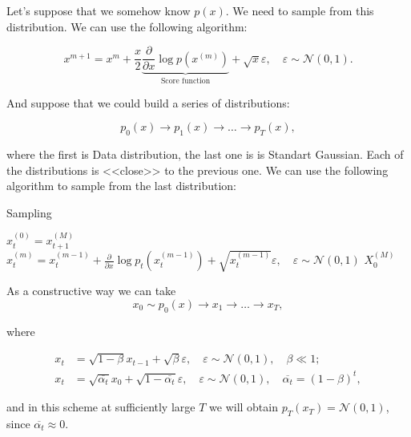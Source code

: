 Let's suppose that we somehow know $p(x)$. We need to sample from this distribution. We can use the following algorithm:

\begin{equation*}
    x^{m+1} = x^m + \frac{x}{2} \underbrace{\frac{\partial}{\partial x} \log p(x^{(m)})}_{\text{Score function}} + \sqrt{x} \varepsilon, \quad \varepsilon \sim \mathcal{N}(0, 1).
\end{equation*}

And suppose that we could build a series of distributions: 

\[ 
    p_0(x) \to p_1(x) \to \ldots \to p_T(x),
\]

where the first is Data distribution, the last one is is Standart Gaussian. Each of the distributions is <<close>> to the previous one. We can use the following algorithm to sample from the last distribution: 

\begin{algorithm}
    \caption{Sampling}
    \begin{algorithmic}
            \State $x_t^{(0)} = x_{t+1}^{(M)}$
                \State $x_{t}^{(m)} = x_{t}^{(m-1)} + \frac{\partial}{\partial x} \log p_t(x_{t}^{(m-1)}) + \sqrt{x_{t}^{(m-1)}} \varepsilon, \quad \varepsilon \sim \mathcal{N}(0, 1)$
            \EndFor
        \EndFor
        \State $X_0^{(M)}$
    \end{algorithmic}
\end{algorithm}

As a constructive way we can take 
\[ 
    x_0 \sim p_0(x) \to x_1 \to \ldots \to x_T,
\]

where 

\begin{equation*}
    \begin{aligned}
        x_t &= \sqrt{1 - \beta} x_{t - 1} + \sqrt{\beta} \varepsilon, \quad \varepsilon \sim \mathcal{N}(0, 1), \quad \beta \ll 1; \\ 
        x_t &= \sqrt{\overline{\alpha_t}} x_0 + \sqrt{1 - \overline{\alpha_t}} \varepsilon, \quad \varepsilon \sim \mathcal{N}(0, 1), \quad \overline{\alpha_t} = (1 - \beta)^t,
    \end{aligned}
\end{equation*}

and in this scheme at sufficiently large $T$ we will obtain $p_T(x_T) = \mathcal{N}(0, 1)$, since $\overline{\alpha_t} \approx 0$. \\ 

